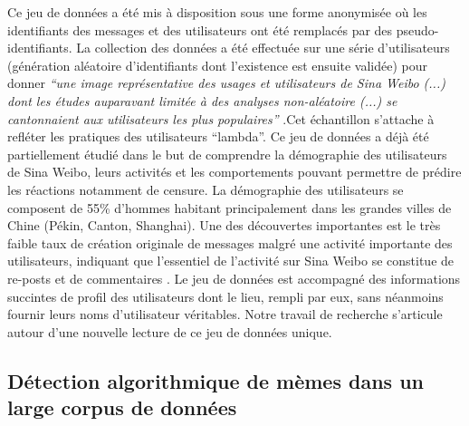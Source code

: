Ce jeu de données a été mis à disposition sous une forme anonymisée o\`u les identifiants des messages et des utilisateurs ont été remplacés par des pseudo-identifiants. La collection des données a été effectuée sur une série d{\textquoteright}utilisateurs (génération aléatoire d{\textquoteright}identifiants dont l{\textquoteright}existence est ensuite validée) pour donner \textit{{\textquotedblleft}une image représentative des usages et utilisateurs de Sina Weibo (...) dont les études auparavant limitée à des analyses non-aléatoire (...) se cantonnaient aux utilisateurs les plus populaires{\textquotedblright} }\citep{Fu2013}.Cet échantillon s{\textquoteright}attache à refléter les pratiques des utilisateurs {\textquotedblleft}lambda{\textquotedblright}. Ce jeu de données a déjà été partiellement étudié dans le but de comprendre la démographie des utilisateurs de Sina Weibo, leurs activités et les comportements pouvant permettre de prédire les réactions notamment de censure. La démographie des utilisateurs se composent de 55\% d{\textquoteright}hommes habitant principalement dans les grandes villes de Chine (Pékin, Canton, Shanghai). Une des découvertes importantes est le très faible taux de création originale de messages malgré une activité importante des utilisateurs, indiquant que l{\textquoteright}essentiel de l{\textquoteright}activité sur Sina Weibo se constitue de re-posts et de commentaires \citep{Fu2013}. Le jeu de données est accompagné des informations succintes de profil des utilisateurs dont le lieu, rempli par eux, sans néanmoins fournir leurs noms d{\textquoteright}utilisateur véritables. Notre travail de recherche s{\textquoteright}articule autour d{\textquoteright}une nouvelle lecture de ce jeu de données unique.

\subsection[Détection algorithmique de mèmes]{Détection algorithmique de mèmes dans un large corpus de données}
\label{sec:protomemes}

